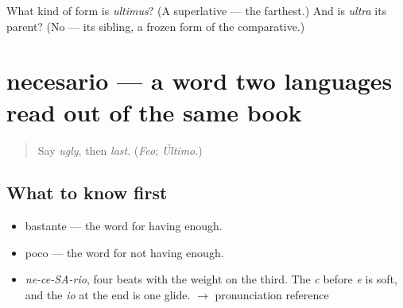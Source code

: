 \begin{tcolorbox}[breakable,colback=teal!4,colframe=teal!35!black,title={Before you move on}]
What kind of form is \emph{ultimus}? (A superlative — the farthest.) And is \emph{ultra} its parent? (No — its sibling, a frozen form of the comparative.)
\end{tcolorbox}
\section[necesario]{necesario — a word two languages read out of the same book}

\label{lesson:ES-C380-necesario}



\begin{quote}
Say \emph{ugly}, then \emph{last}. (\emph{Feo}; \emph{Último}.)
\end{quote}

\subsection*{What to know first}
\begin{itemize}
\raggedright
  \item bastante — the word for having enough.
  \item poco — the word for not having enough.
\end{itemize}

\begin{sounds}
\begin{itemize}
\raggedright
  \item \emph{ne-ce-SA-rio}, four beats with the weight on the third. The \emph{c} before \emph{e} is soft, and the \emph{io} at the end is one glide. $\to$ pronunciation reference
\end{itemize}
\end{sounds}

